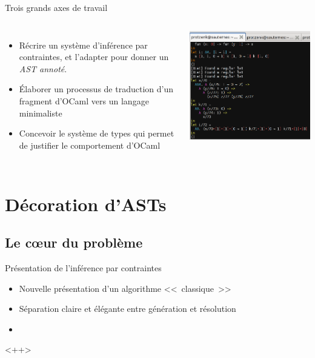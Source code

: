 \documentclass[final]{beamer}
\begin{document}
\begin{frame}{Trois grands axes de travail}
  \begin{columns}
      \begin{itemize}
        \item Récrire un système d'inférence par contraintes, et l'adapter pour
          donner un \emph{AST annoté}.
        \item Élaborer un processus de traduction d'un fragment d'OCaml vers un
          langage minimaliste
        \item Concevoir le système de types qui permet de justifier le comportement
          d'OCaml
      \end{itemize}
      \includegraphics[width=\columnwidth]{screen1.png}
  \end{columns}
\end{frame}

\section{Décoration d'ASTs}

\subsection{Le cœur du problème}

\begin{frame}{Présentation de l'inférence par contraintes}
  \begin{itemize}
    \item Nouvelle présentation d'un algorithme <<~classique~>>
    \item Séparation claire et élégante entre génération et résolution
    \item 
  \end{itemize}<++>
\end{frame}
\end{document}
